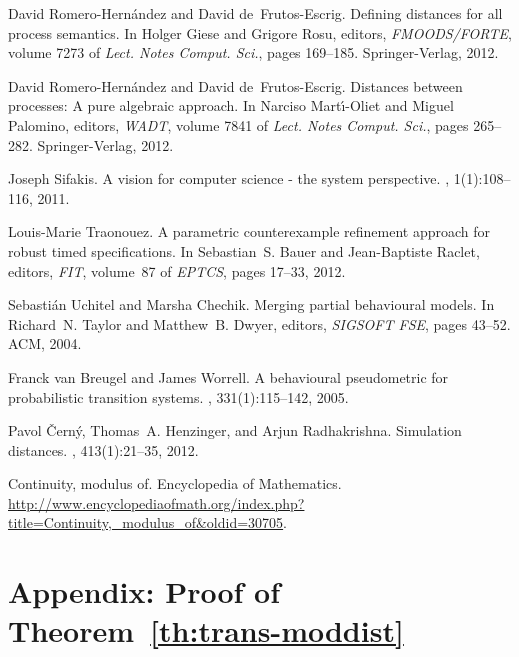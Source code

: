 \documentclass[twocolumn]{svjour3-dummy}
\begin{document}
\begin{thebibliography}{10}
David Romero-Hern{\'a}ndez and David de~Frutos-Escrig.
\newblock Defining distances for all process semantics.
\newblock In Holger Giese and Grigore Rosu, editors, {\em FMOODS/FORTE}, volume
  7273 of {\em {Lect. Notes Comput. Sci.}}, pages 169--185. {Springer-Verlag},
  2012.

David Romero-Hern{\'a}ndez and David de~Frutos-Escrig.
\newblock Distances between processes: A pure algebraic approach.
\newblock In Narciso Mart\'{\i}-Oliet and Miguel Palomino, editors, {\em WADT},
  volume 7841 of {\em {Lect. Notes Comput. Sci.}}, pages 265--282.
  {Springer-Verlag}, 2012.

Joseph Sifakis.
\newblock A vision for computer science - the system perspective.
, 1(1):108--116, 2011.

Louis-Marie Traonouez.
\newblock A parametric counterexample refinement approach for robust timed
  specifications.
\newblock In Sebastian~S. Bauer and Jean{-}Baptiste Raclet, editors, {\em FIT},
  volume~87 of {\em EPTCS}, pages 17--33, 2012.

Sebasti{\'a}n Uchitel and Marsha Chechik.
\newblock Merging partial behavioural models.
\newblock In Richard~N. Taylor and Matthew~B. Dwyer, editors, {\em SIGSOFT
  FSE}, pages 43--52. ACM, 2004.

Franck van Breugel and James Worrell.
\newblock A behavioural pseudometric for probabilistic transition systems.
, 331(1):115--142, 2005.

Pavol \v{C}ern{\'y}, Thomas~A. Henzinger, and Arjun Radhakrishna.
\newblock Simulation distances.
, 413(1):21--35, 2012.

Continuity, modulus of.
\newblock Encyclopedia of Mathematics.
\newblock
  \url{http://www.encyclopediaofmath.org/index.php?title=Continuity,_modulus_of&oldid=30705}.

\end{thebibliography}


\section*{Appendix: Proof of Theorem~\ref{th:trans-moddist}}
\end{document}
